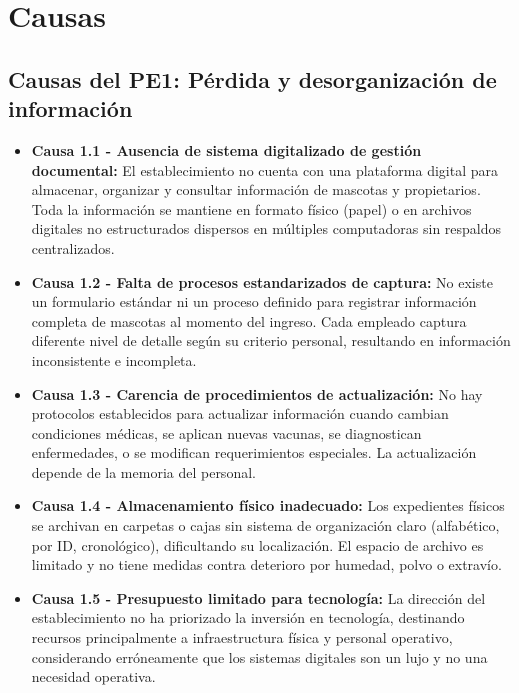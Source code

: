 \section{Causas}
\label{sec:causas}

\subsection{Causas del PE1: Pérdida y desorganización de información}
\label{sec:causas1}

	\begin{itemize}
		\item \textbf{Causa 1.1 - Ausencia de sistema digitalizado de gestión documental:} El establecimiento no cuenta con una plataforma digital para almacenar, organizar y consultar información de mascotas y propietarios. Toda la información se mantiene en formato físico (papel) o en archivos digitales no estructurados dispersos en múltiples computadoras sin respaldos centralizados.
		
		\item \textbf{Causa 1.2 - Falta de procesos estandarizados de captura:} No existe un formulario estándar ni un proceso definido para registrar información completa de mascotas al momento del ingreso. Cada empleado captura diferente nivel de detalle según su criterio personal, resultando en información inconsistente e incompleta.
		
		\item \textbf{Causa 1.3 - Carencia de procedimientos de actualización:} No hay protocolos establecidos para actualizar información cuando cambian condiciones médicas, se aplican nuevas vacunas, se diagnostican enfermedades, o se modifican requerimientos especiales. La actualización depende de la memoria del personal.
		
		\item \textbf{Causa 1.4 - Almacenamiento físico inadecuado:} Los expedientes físicos se archivan en carpetas o cajas sin sistema de organización claro (alfabético, por ID, cronológico), dificultando su localización. El espacio de archivo es limitado y no tiene medidas contra deterioro por humedad, polvo o extravío.
		
		\item \textbf{Causa 1.5 - Presupuesto limitado para tecnología:} La dirección del establecimiento no ha priorizado la inversión en tecnología, destinando recursos principalmente a infraestructura física y personal operativo, considerando erróneamente que los sistemas digitales son un lujo y no una necesidad operativa.
	\end{itemize}

